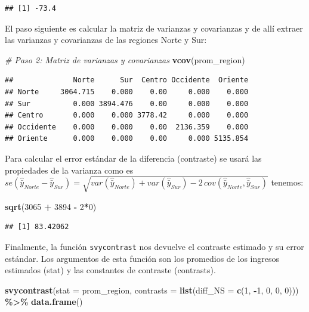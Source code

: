 \documentclass[
  spanish,
  12pt,
]{book}
\newenvironment{Shaded}{\begin{snugshade}}{\end{snugshade}}
\newcommand{\AttributeTok}[1]{\textcolor[rgb]{0.13,0.29,0.53}{#1}}
\newcommand{\CommentTok}[1]{\textcolor[rgb]{0.56,0.35,0.01}{\textit{#1}}}
\newcommand{\DecValTok}[1]{\textcolor[rgb]{0.00,0.00,0.81}{#1}}
\newcommand{\FunctionTok}[1]{\textcolor[rgb]{0.13,0.29,0.53}{\textbf{#1}}}
\newcommand{\NormalTok}[1]{#1}
\newcommand{\SpecialCharTok}[1]{\textcolor[rgb]{0.81,0.36,0.00}{\textbf{#1}}}
\begin{document}
\begin{verbatim}
## [1] -73.4
\end{verbatim}

El paso siguiente es calcular la matriz de varianzas y covarianzas y de allí extraer las varianzas y covarianzas de las regiones Norte y Sur:

\begin{Shaded}
\begin{Highlighting}[]
\CommentTok{\# Paso 2: Matriz de varianzas y covarianzas}
\FunctionTok{vcov}\NormalTok{(prom\_region)}
\end{Highlighting}
\end{Shaded}

\begin{verbatim}
##              Norte      Sur  Centro Occidente  Oriente
## Norte     3064.715    0.000    0.00     0.000    0.000
## Sur          0.000 3894.476    0.00     0.000    0.000
## Centro       0.000    0.000 3778.42     0.000    0.000
## Occidente    0.000    0.000    0.00  2136.359    0.000
## Oriente      0.000    0.000    0.00     0.000 5135.854
\end{verbatim}

Para calcular el error estándar de la diferencia (contraste) se usará las propiedades de la varianza como es
\(se\left(\hat{\bar{y}}_{Norte}-\hat{\bar{y}}_{Sur}\right)=\sqrt{var\left(\hat{\bar{y}}_{Norte}\right)+var\left(\hat{\bar{y}}_{Sur}\right)-2\,cov\left(\hat{\bar{y}}_{Norte},\hat{\bar{y}}_{Sur}\right)}\) tenemos:

\begin{Shaded}
\begin{Highlighting}[]
\FunctionTok{sqrt}\NormalTok{(}\DecValTok{3065} \SpecialCharTok{+} \DecValTok{3894} \SpecialCharTok{{-}} \DecValTok{2}\SpecialCharTok{*}\DecValTok{0}\NormalTok{)}
\end{Highlighting}
\end{Shaded}

\begin{verbatim}
## [1] 83.42062
\end{verbatim}

Finalmente, la función \texttt{svycontrast} nos devuelve el contraste estimado y su error estándar. Los argumentos de esta función son los promedios de los ingresos estimados (stat) y las constantes de contraste (contrasts).

\begin{Shaded}
\begin{Highlighting}[]
\FunctionTok{svycontrast}\NormalTok{(}\AttributeTok{stat =}\NormalTok{ prom\_region,}
            \AttributeTok{contrasts =} \FunctionTok{list}\NormalTok{(}\AttributeTok{diff\_NS =} \FunctionTok{c}\NormalTok{(}\DecValTok{1}\NormalTok{, }\SpecialCharTok{{-}}\DecValTok{1}\NormalTok{, }\DecValTok{0}\NormalTok{, }\DecValTok{0}\NormalTok{, }\DecValTok{0}\NormalTok{))) }\SpecialCharTok{\%\textgreater{}\%}
            \FunctionTok{data.frame}\NormalTok{()}
\end{Highlighting}
\end{Shaded}
\end{document}
